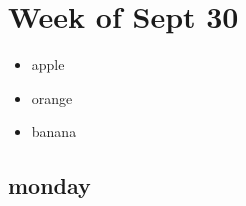 \documentclass[12pt]{article}
\begin{document}
\tableofcontents
\newpage
\section{Week of Sept 30}
    \begin{itemize}
        \item apple
        \item orange
        \item banana
    \end{itemize}
    
    \subsection{monday}
\end{document}
